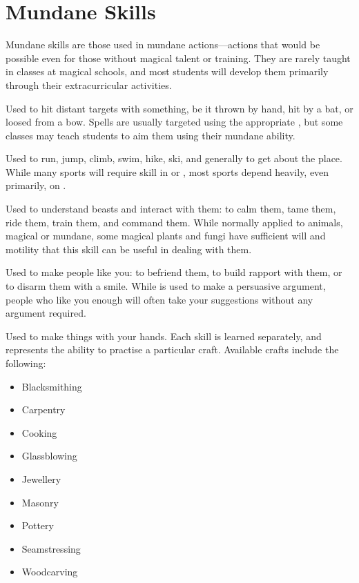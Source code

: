 \section{Mundane Skills}

Mundane skills are those used in mundane actions---actions that would be possible even for those without magical talent or training.
They are rarely taught in classes at magical schools, and most students will develop them primarily through their extracurricular activities.


Used to hit distant targets with something, be it thrown by hand, hit by a bat, or loosed from a bow.
Spells are usually targeted using the appropriate {\magicskill}, but some classes may teach students to aim them using their mundane ability. %


Used to run, jump, climb, swim, hike, ski, and generally to get about the place.
While many sports will require skill in  or , most sports depend heavily, even primarily, on .


Used to understand beasts and interact with them: to calm them, tame them, ride them, train them, and command them.
While normally applied to animals, magical or mundane, some magical plants and fungi have sufficient will and motility that this skill can be useful in dealing with them.


Used to make people like you: to befriend them, to build rapport with them, or to disarm them with a smile.
While  is used to make a persuasive argument, people who like you enough will often take your suggestions without any argument required.


Used to make things with your hands.
Each  skill is learned separately, and represents the ability to practise a particular craft.
Available crafts include the following:
\begin{itemize}
	\item Blacksmithing
	\item Carpentry
	\item Cooking
	\item Glassblowing
	\item Jewellery
	\item Masonry
	\item Pottery
	\item Seamstressing
	\item Woodcarving
\end{itemize}

